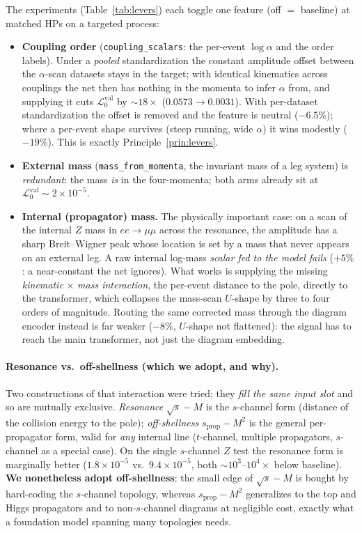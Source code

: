 \documentclass[11pt]{article}
\newcommand{\vlnr}{\mathcal{L}^{\mathrm{val}}_{0}}   %
\newcommand{\code}[1]{\texttt{#1}}
\begin{document}
The experiments (Table~\ref{tab:levers}) each toggle one feature (off $=$ baseline) at matched
HPs on a targeted process:
\begin{itemize}
  \item \textbf{Coupling order} (\code{coupling\_scalars}: the per-event $\log\alpha$ and the
  order labels). Under a \emph{pooled} standardization the constant amplitude offset between the
  $\alpha$-scan datasets stays in the target; with identical kinematics across couplings the net
  then has nothing in the momenta to infer $\alpha$ from, and supplying it cuts $\vlnr$ by
  $\sim18\times$ ($0.0573\!\to\!0.0031$). With per-dataset standardization the offset is removed
  and the feature is neutral ($-6.5\%$); where a per-event shape survives (steep running, wide
  $\alpha$) it wins modestly ($-19\%$). This is exactly Principle~\ref{prin:levers}.
  \item \textbf{External mass} (\code{mass\_from\_momenta}, the invariant mass of a leg system)
  is \emph{redundant}: the mass \emph{is} in the four-momenta; both arms already sit at
  $\vlnr\!\sim\!2\times10^{-5}$.
  \item \textbf{Internal (propagator) mass.} The physically important case: on a scan of the
  internal $Z$ mass in $ee\!\to\!\mu\mu$ across the resonance, the amplitude has a sharp
  Breit--Wigner peak whose location is set by a mass that never appears on an external leg. A raw
  internal log-mass \emph{scalar fed to the model fails} ($+5\%$: a near-constant the net
  ignores). What works is supplying the missing \emph{kinematic$\,\times\,$mass interaction},
  the per-event distance to the pole, directly to the transformer, which collapses the
  mass-scan $U$-shape by three to four orders of magnitude. Routing the same corrected mass
  through the diagram encoder instead is far weaker ($-8\%$, $U$-shape not flattened): the signal
  has to reach the main transformer, not just the diagram embedding.
\end{itemize}

\paragraph{Resonance vs.\ off-shellness (which we adopt, and why).} Two constructions of that
interaction were tried; they \emph{fill the same input slot} and so are mutually exclusive.
\emph{Resonance} $\sqrt s-M$ is the $s$-channel form (distance of the collision energy to the
pole); \emph{off-shellness} $s_{\mathrm{prop}}-M^2$ is the general per-propagator form, valid for
\emph{any} internal line ($t$-channel, multiple propagators, $s$-channel as a special case). On
the single $s$-channel $Z$ test the resonance form is marginally better ($1.8\times10^{-5}$ vs.\
$9.4\times10^{-5}$, both $\sim\!10^3$--$10^4\times$ below baseline). \textbf{We nonetheless adopt
off-shellness}: the small edge of $\sqrt s-M$ is bought by hard-coding the $s$-channel topology,
whereas $s_{\mathrm{prop}}-M^2$ generalizes to the top and Higgs propagators and to non-$s$-channel
diagrams at negligible cost, exactly what a foundation model spanning many topologies needs.
\end{document}
